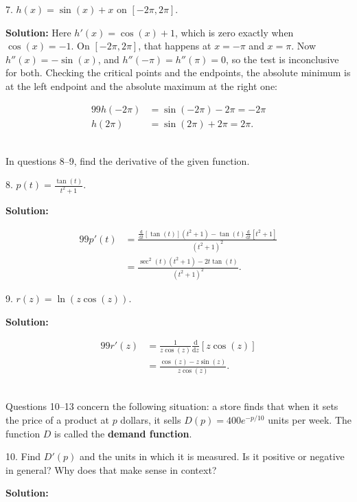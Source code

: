 \documentclass{article}
\begin{document}
7. $h(x) = \sin(x) + x$ on $[-2\pi, 2\pi]$.

\textbf{Solution:} Here $h'(x) = \cos(x) + 1$, which is zero exactly when $\cos(x) = -1$. On $[-2\pi, 2\pi]$, that happens at $x = -\pi$ and $x = \pi$. Now $h''(x) = -\sin(x)$, and $h''(-\pi) = h''(\pi) = 0$, so the test is inconclusive for both. Checking the critical points and the endpoints, the absolute minimum is at the left endpoint and the absolute maximum at the right one:

\begin{alignat*}{99}
	h(-2\pi) &= \sin(-2\pi) - 2\pi = -2\pi\\
	h(2\pi) &= \sin(2\pi) + 2\pi = 2\pi.
\end{alignat*}

~\\

In questions 8--9, find the derivative of the given function.

8. $\displaystyle p(t) = \frac{\tan(t)}{t^2 + 1}$.

\textbf{Solution:}

\begin{alignat*}{99}
	p'(t) &= \frac{\frac{\mathrm{d}}{\mathrm{d}t}[\tan(t)] \left( t^2 + 1 \right) - \tan(t) \frac{\mathrm{d}}{\mathrm{d}t}[t^2 + 1]}{\left( t^2 + 1 \right)^2}\\
	&= \frac{\sec^2(t) \left( t^2 + 1 \right) - 2t\tan(t)}{\left( t^2 + 1 \right)^2}.
\end{alignat*}

9. $\displaystyle r(z) = \ln\left( z\cos(z) \right)$.

\textbf{Solution:}

\begin{alignat*}{99}
	r'(z) &= \frac{1}{z\cos(z)} \frac{\mathrm{d}}{\mathrm{d}z}[z\cos(z)]\\
	&= \frac{\cos(z) - z\sin(z)}{z\cos(z)}.
\end{alignat*}

~\\

Questions 10--13 concern the following situation: a store finds that when it sets the price of a product at $p$ dollars, it sells $D(p) = 400e^{-p/10}$ units per week. The function $D$ is called the \textbf{demand function}.

10. Find $D'(p)$ and the units in which it is measured. Is it positive or negative in general? Why does that make sense in context?

\textbf{Solution:}
\end{document}
